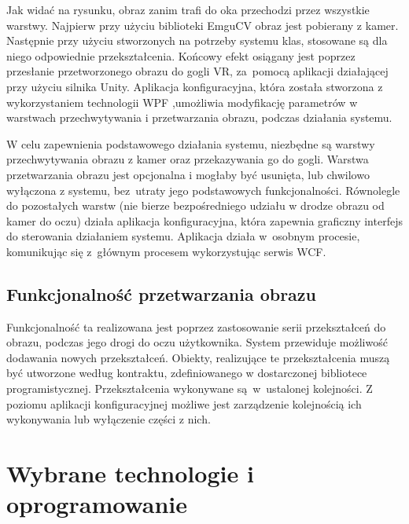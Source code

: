 \documentclass[a4paper,11pt,twoside]{report}
\theoremstyle{definition}
\begin{document}
Jak widać na rysunku, obraz zanim trafi do oka przechodzi przez wszystkie warstwy. Najpierw przy użyciu biblioteki EmguCV obraz jest pobierany z kamer. Następnie przy użyciu stworzonych na potrzeby systemu klas, stosowane są dla niego odpowiednie przekształcenia. Końcowy efekt osiągany jest poprzez przesłanie przetworzonego obrazu do gogli VR, za~pomocą aplikacji działającej przy użyciu silnika Unity. Aplikacja konfiguracyjna, która została stworzona z wykorzystaniem technologii WPF ,umożliwia modyfikację parametrów w warstwach przechwytywania i przetwarzania obrazu, podczas działania systemu. 

W celu zapewnienia podstawowego działania systemu, niezbędne są warstwy przechwytywania obrazu z kamer oraz przekazywania go do gogli. Warstwa przetwarzania obrazu jest opcjonalna i mogłaby być usunięta, lub chwilowo wyłączona z systemu, bez~utraty jego podstawowych funkcjonalności. Równolegle do pozostałych warstw (nie bierze bezpośredniego udziału w drodze obrazu od kamer do oczu) działa aplikacja konfiguracyjna, która zapewnia graficzny interfejs do sterowania działaniem systemu. Aplikacja działa w~osobnym procesie, komunikując się z~głównym procesem wykorzystując serwis WCF.

\subsection{Funkcjonalność przetwarzania obrazu}
Funkcjonalność ta realizowana jest poprzez zastosowanie serii przekształceń do obrazu, podczas jego drogi do oczu użytkownika. System przewiduje możliwość dodawania nowych przekształceń. Obiekty, realizujące te przekształcenia muszą być utworzone według kontraktu, zdefiniowanego w dostarczonej bibliotece programistycznej. Przekształcenia wykonywane są~w~ustalonej kolejności. Z poziomu aplikacji konfiguracyjnej możliwe jest zarządzenie kolejnością ich wykonywania lub wyłączenie części z nich.

\section{Wybrane technologie i oprogramowanie}
\end{document}
